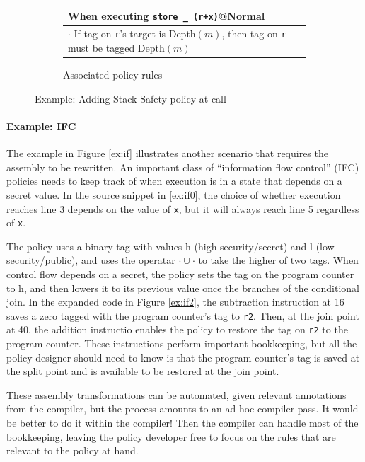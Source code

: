 \documentclass{report}
\begin{document}
\begin{figure}
\begin{subfigure}{\textwidth}
    \begin{tabular}{|l|}
      \hline
      When executing {\tt store \_ (r+x)}@{\sc Normal} \\
      \hline
      \rowcolor{blue!30}
      \(\cdot\) If tag on {\tt r}'s target is {\sc Depth}\((m)\), then
      tag on {\tt r} must be tagged {\sc Depth}\((m)\) \\
      \hline
    \end{tabular}
    \caption{Associated policy rules}
    \label{ex:call3}
  \end{subfigure}

  \caption{Example: Adding Stack Safety policy at call}
  \label{ex:call}
\end{figure}

\paragraph{Example: IFC}

The example in Figure \ref{ex:if} illustrates another scenario that requires the assembly to be
rewritten. An important class of ``information flow control'' (IFC) policies needs to keep track
of when execution is in a state that depends on a secret value. In the source snippet in \ref{ex:if0},
the choice of whether execution reaches line 3 depends on the value of {\tt x},
but it will always reach line 5 regardless of {\tt x}.

The policy uses a binary tag with values {\sc h} (high security/secret) and
{\sc l} (low security/public), and uses the operatar \(\cdot \cup \cdot\) to take the higher
of two  tags. When control flow depends on a secret, the policy sets the tag on the
program counter to {\sc h}, and then lowers it to its previous value once the branches of the
conditional join. In the expanded code in Figure \ref{ex:if2},
the subtraction instruction at 16 saves a zero tagged with the program counter's tag to {\tt r2}.
Then, at the join point at 40, the addition instructio enables the policy to restore the tag on
{\tt r2} to the program counter. These instructions perform important bookkeeping,
but all the policy designer should need to know is that the program counter's 
tag is saved at the split point and is available to be restored at the join point.

These assembly transformations can be automated, given relevant annotations from
the compiler, but the process amounts to an ad hoc compiler pass. It would be better to do it
within the compiler! Then the compiler can handle most of the bookkeeping, leaving the policy
developer free to focus on the rules that are relevant to the policy at hand.
\end{document}
